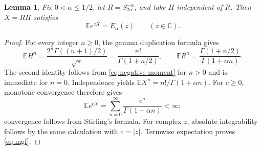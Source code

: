 \documentclass[11pt]{article}
\newtheorem{lemma}[theorem]{Lemma}
\newcommand{\E}{\mathbb E}
\begin{document}
\begin{lemma}\label{lem:scale}
Fix $0<\alpha\leq1/2$, let $R=S_{2\alpha}^{-\alpha}$, and take $H$
independent of $R$. Then $X=RH$ satisfies
\begin{equation}\label{eq:mgf}
 \E e^{zX}=E_\alpha(z)\qquad(z\in\mathbb C).
\end{equation}
\end{lemma}
\begin{proof}
For every integer $n\geq0$, the gamma duplication formula gives
\[
 \E H^n=\frac{2^n\Gamma((n+1)/2)}{\sqrt\pi}
       =\frac{n!}{\Gamma(1+n/2)},\qquad
 \E R^n=\frac{\Gamma(1+n/2)}{\Gamma(1+\alpha n)}.
\]
The second identity follows from \eqref{eq:negative-moment} for $n>0$
and is immediate for $n=0$. Independence yields
$\E X^n=n!/\Gamma(1+\alpha n)$.
For $c\geq0$, monotone convergence therefore gives
\[
 \E e^{cX}=\sum_{n=0}^\infty\frac{c^n}{\Gamma(1+\alpha n)}<\infty;
\]
convergence follows from Stirling's formula. For complex $z$, absolute
integrability follows by the same calculation with $c=|z|$.
Termwise expectation proves \eqref{eq:mgf}.
\end{proof}
\end{document}
